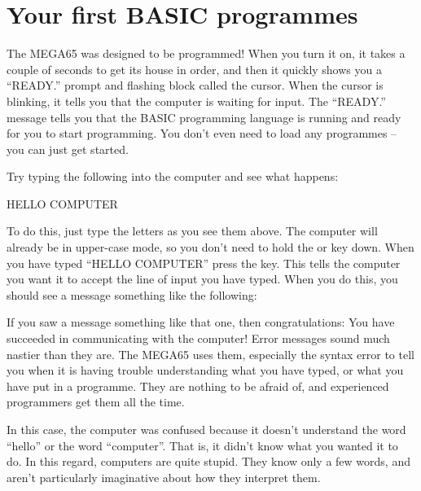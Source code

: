 \section{Your first BASIC programmes}

The MEGA65 was designed to be programmed! When you turn it on,
it takes a couple of seconds to get its house in order, and then
it quickly shows you a ``READY.'' prompt and flashing block called
the cursor.  When the cursor is blinking, it tells you that the
computer is waiting for input.  The ``READY.'' message tells you
that the BASIC programming language is running and ready for you to
start programming.  You don't even need to load any programmes --
you can just get started.

\needspace{4cm} %
Try typing the following into the computer and see what happens:

\begin{screenoutput}
HELLO COMPUTER
\end{screenoutput}

\needspace{4cm} %

To do this, just type the letters as you see them above.  The computer
will already be in upper-case mode, so you don't need to hold the 
or  key down.  When you have typed ``HELLO COMPUTER'' press
  the  key.  This tells the computer you want it to accept the
  line of input you have typed.  When you do this, you should see a message something
  like the following:


  If you saw a  message something like that one, then congratulations:
  You have succeeded in communicating with the computer!
  Error messages sound much nastier than they are.  The MEGA65 uses them, especially
  the syntax error to tell you when it is having trouble understanding what you have
  typed, or what you have put in a programme.  They are nothing to be afraid of, and
  experienced programmers get them all the time.

  In this case, the computer was confused because it doesn't understand the word
  ``hello'' or the word ``computer''.  That is, it didn't know what you wanted it to
  do.  In this regard, computers are quite stupid. They know only a few words, and
  aren't particularly imaginative about how they interpret them.

